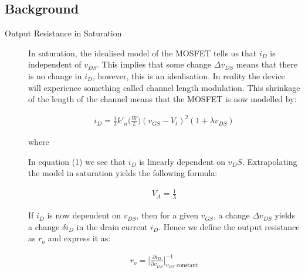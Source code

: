 \documentclass{article}
\begin{document}
\subsection{Background}
\label{definitions}
\begin{description}
\item[Output Resistance in Saturation]
In saturation, the idealised model of the MOSFET tells us that $i_D$ is independent of $v_{DS}$. This implies that some change $\Delta v_{DS}$ means that there is no change in $i_D$, however, this is an idealisation. In reality the device will experience something called channel length modulation. This shrinkage of the length of the channel means that the MOSFET is now modelled by: 

\begin{align}
i_D = \frac{1}{2}k'_{n}\bigg(\frac{W}{L}\bigg)(v_{GS} - V_t)^2(1 + \lambda v_{DS})
\end{align}

where


In equation (1) we see that $i_D$ is linearly dependent on $v_DS$. Extrapolating the model in saturation yields the following formula:

\begin{align}
V_A = \frac{1}{\lambda}
\end{align}

If $i_D$ is now dependent on $v_{DS}$, then for a given $v_{GS}$, a change $\Delta v_{DS}$ yields a change $\delta i_D$ in the drain current $i_D$. Hence we define the output resistance as $r_o$ and express it as:

\begin{align}
r_o = \bigg[ \frac{\partial i_D}{\partial v_{DS}}\bigg]^{-1}_{v_{GS} \text{ constant}}
\end{align}

\end{description} 
 
\end{document}
